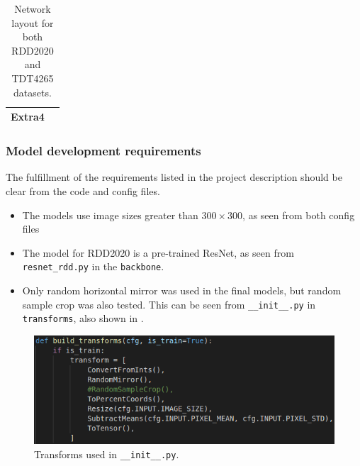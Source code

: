 \begin{table}[h!]
\begin{tabular}{|c|c|}
      \hline
      \makecell{\rule{0pt}{4ex}Extra4\\\rule{0pt}{2ex}} & \makecell{$\begin{bmatrix} 3\times3, 512 \\ 3\times3, 512 \end{bmatrix}\times 2$}\\
      \hline
    \end{tabular}
    \caption{Network layout for both RDD2020 and TDT4265 datasets.}
    \label{tab:layout}
\end{table}


\subsubsection*{Model development requirements}

The fulfillment of the requirements listed in the project description should be clear from the code and config files.

\begin{itemize}
  \item The models use image sizes greater than $300\times 300$, as seen from both config files 
  \item The model for RDD2020 is a pre-trained ResNet, as seen from \texttt{resnet\_rdd.py} in the \texttt{backbone}.
  \item Only random horizontal mirror was used in the final models, but random sample crop was also tested. This can be seen from \texttt{\_\_init\_\_.py} in \texttt{transforms}, also shown in .
\end{itemize}

\begin{figure}
  \centering
  \includegraphics[width=\textwidth]{transforms.png}
  \caption{Transforms used in \texttt{\_\_init\_\_.py}.}
  \label{fig:transforms}
\end{figure}

